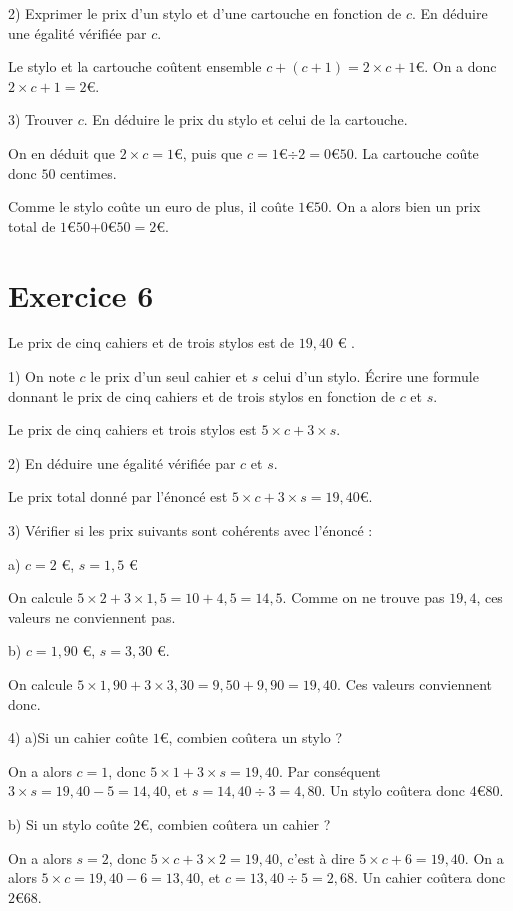 \documentclass[12 pt]{article}
\theoremstyle{plain}
\newcounter{n}
\numberwithin{n}{section}
\begin{document}
2) Exprimer le prix d'un stylo et d'une cartouche en fonction de $c$. En déduire une égalité vérifiée par $c$. 

Le stylo et la cartouche coûtent ensemble $c+(c+1)=2\times c +1$\euro. On a donc $2\times c +1 = 2$\euro. 

3) Trouver $c$. En déduire le prix du stylo et celui de la cartouche.  

On en déduit que $2\times c = 1$\euro, puis que $c = 1$\euro$ \div 2 = 0$\euro$50$. La cartouche coûte donc $50$ centimes. 

Comme le stylo coûte un euro de plus, il coûte $1$\euro$50$. On a alors bien un prix total de $1$\euro$50$+$0$\euro$50=2$\euro.

\section{Exercice 6}

Le prix de cinq cahiers et de trois stylos est de $19,40$ \euro{} . 

1) On note $c$ le prix d'un seul cahier et $s$ celui d'un stylo. Écrire une formule donnant le prix de cinq cahiers et de trois stylos en fonction de $c$ et $s$. 

Le prix de cinq cahiers et trois stylos est $5\times c + 3 \times s$. 

2) En déduire une égalité vérifiée par $c$ et $s$. 

Le prix total donné par l'énoncé est $5\times c + 3\times s = 19,40$\euro. 

3) Vérifier si les prix suivants sont cohérents avec l'énoncé : 

a) $c= 2$ \euro{}, $s= 1,5$ \euro{}

On calcule $5\times 2 + 3 \times 1,5 = 10 + 4,5 = 14,5$. Comme on ne trouve pas $19,4$, ces valeurs ne conviennent pas. 

b) $c = 1,90$ \euro{}, $s= 3, 30$ \euro{}.

On calcule $5\times 1,90 + 3 \times 3,30 = 9,50 + 9,90 = 19,40$. Ces valeurs conviennent donc. 

4) a)Si un cahier coûte $1$\euro{}, combien coûtera un stylo ? 

On a alors $c=1$, donc $5\times 1 + 3 \times s = 19,40$. Par conséquent $3\times s = 19,40 - 5 = 14,40$, et $s = 14,40\div 3 = 4, 80$. 
Un stylo coûtera donc $4$\euro$80$. 

b) Si un stylo coûte $2$\euro{}, combien coûtera un cahier ? 

On a alors $s = 2$, donc $5\times c + 3 \times 2 = 19,40$, c'est à dire $5\times c + 6 = 19,40$. On a alors $5\times c = 19,40 - 6 = 13,40$, et 
$c = 13,40 \div 5 = 2,68$. Un cahier coûtera donc $2$\euro$68$. 
\newpage
\end{document}
